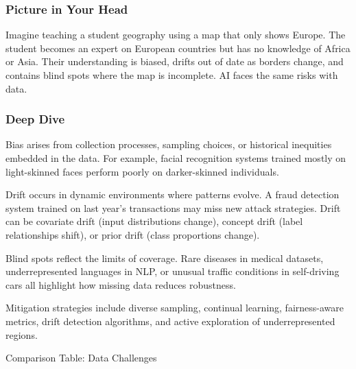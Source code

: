 \documentclass[
  letterpaper,
  DIV=11,
  numbers=noendperiod]{scrreprt}
\begin{document}
\subsubsection{Picture in Your Head}\label{picture-in-your-head-75}

Imagine teaching a student geography using a map that only shows Europe.
The student becomes an expert on European countries but has no knowledge
of Africa or Asia. Their understanding is biased, drifts out of date as
borders change, and contains blind spots where the map is incomplete. AI
faces the same risks with data.

\subsubsection{Deep Dive}\label{deep-dive-75}

Bias arises from collection processes, sampling choices, or historical
inequities embedded in the data. For example, facial recognition systems
trained mostly on light-skinned faces perform poorly on darker-skinned
individuals.

Drift occurs in dynamic environments where patterns evolve. A fraud
detection system trained on last year's transactions may miss new attack
strategies. Drift can be covariate drift (input distributions change),
concept drift (label relationships shift), or prior drift (class
proportions change).

Blind spots reflect the limits of coverage. Rare diseases in medical
datasets, underrepresented languages in NLP, or unusual traffic
conditions in self-driving cars all highlight how missing data reduces
robustness.

Mitigation strategies include diverse sampling, continual learning,
fairness-aware metrics, drift detection algorithms, and active
exploration of underrepresented regions.

Comparison Table: Data Challenges
\end{document}
